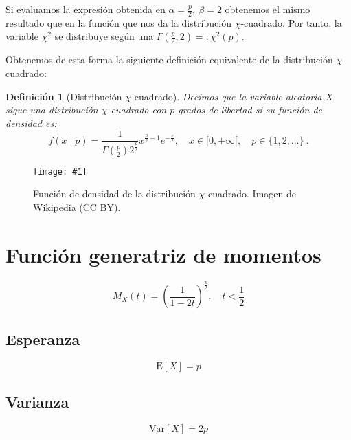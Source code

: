 \documentclass[a4paper, 10pt]{article} %
\newcommand{\figura}[2]{\begin{figure}[hbtp]\centering \texttt{[image: \#1]} \caption{#2} \end{figure}}
\newtheorem{definition}{Definición}[section]
\begin{document}
Si evaluamos la expresión obtenida en $\alpha=\frac p 2,~\beta=2$ obtenemos el mismo resultado que en la función que nos da la distribución $\chi$-cuadrado. Por tanto, la variable $\chi^2$ se distribuye según una $\Gamma(\frac p 2, 2)=:\chi^2(p)$.

Obtenemos de esta forma la siguiente definición equivalente de la distribución $\chi$-cuadrado:
\begin{definition}[Distribución $\chi$-cuadrado]
  Decimos que la variable aleatoria $X$ sigue una distribución $\chi$-cuadrado con $p$ grados de libertad si su función de densidad es:
  $$f(x\mid p) = \frac 1 {\Gamma(\frac p 2)2^{\frac p 2}}x^{\frac p 2-1}e^{-\frac x 2},\quad x\in[0,+\infty[,\quad p\in\{1,2,\dots\}~.$$
\end{definition}

\figura{pdf.png}{Función de densidad de la distribución $\chi$-cuadrado. Imagen de Wikipedia (CC BY).}

\section{Función generatriz de momentos}
$$M_X(t)=\left(\frac 1 {1 - 2t}\right)^{\frac p 2},\quad t<\frac 1 2$$

\subsection{Esperanza}
$$\mathrm E[X]=p$$

\subsection{Varianza}
$$\mathrm{Var}[X]=2p$$
\end{document}
